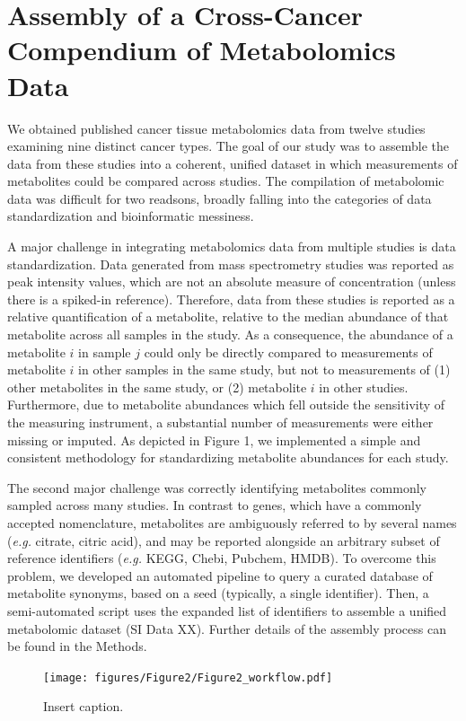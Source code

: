 \documentclass[10pt]{article}
\begin{document}
\section{Assembly of a Cross-Cancer Compendium of Metabolomics Data}
We obtained published cancer tissue metabolomics data from twelve studies examining nine distinct cancer types. The goal of our study was to assemble the data from these studies into a coherent, unified dataset in which measurements of metabolites could be compared across studies. The compilation of metabolomic data was difficult for two readsons, broadly falling into the categories of data standardization and bioinformatic messiness.

A major challenge in integrating metabolomics data from multiple studies is data standardization. Data generated from mass spectrometry studies was reported as peak intensity values, which are not an absolute measure of concentration (unless there is a spiked-in reference). Therefore, data from these studies is reported as a relative quantification of a metabolite, relative to the median abundance of that metabolite across all samples in the study. As a consequence, the abundance of a metabolite $i$ in sample $j$ could only be directly compared to measurements of metabolite $i$ in other samples in the same study, but not to measurements of  (1) other metabolites in the same study, or (2) metabolite $i$ in other studies. Furthermore, due to metabolite abundances which fell outside the sensitivity of the measuring instrument, a substantial number of measurements were either missing or imputed. As depicted in Figure 1, we implemented a simple and consistent methodology for standardizing metabolite abundances for each study. 

The second major challenge was correctly identifying metabolites commonly sampled across many studies. In contrast to genes, which have a commonly accepted nomenclature, metabolites are ambiguously referred to by several names (\textit{e.g.} citrate, citric acid), and may be reported alongside an arbitrary subset of reference identifiers (\textit{e.g.} KEGG, Chebi, Pubchem, HMDB). To overcome this problem, we developed an automated pipeline to query a curated database of metabolite synonyms, based on a seed (typically, a single identifier). Then, a semi-automated script uses the expanded list of identifiers to assemble a unified metabolomic dataset (SI Data XX). Further details of the assembly process can be found in the Methods.

\begin{figure}[ht!]
  \centering
     \texttt{[image: figures/Figure2/Figure2\_workflow.pdf]}
  \caption{Insert caption. }
     \label{fig:Fig2}
\end{figure}
\end{document}
